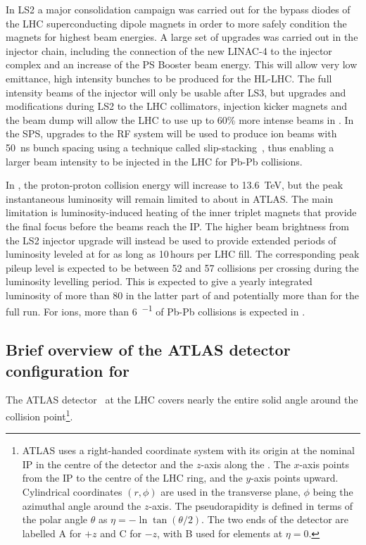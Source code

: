 \documentclass[cernpreprint, atlasdraft=false, UKenglish,british,orcidlogo, texmf, orcidlogo]{atlasdoc}
\begin{document}
In \gls{LS2} a major consolidation campaign was carried out for the
bypass diodes of the \gls{LHC} superconducting dipole magnets in order
to more safely condition the magnets for highest beam energies. A
large set of upgrades was carried out in the injector chain, including
the connection of the new \gls{LINAC-4} to the injector complex and an
increase of the \gls{PS} Booster beam energy. This will
allow very low emittance, high intensity bunches to be produced for
the \gls{HL-LHC}. The full intensity beams of the injector will only
be usable after \gls{LS3}, but upgrades and modifications during
\gls{LS2} to the \gls{LHC} collimators, injection kicker magnets and
the beam dump will allow the \gls{LHC} to use up to 60\% more intense
beams in \RunThr. In the \gls{SPS}, upgrades to the RF
system will be used to produce ion beams with \SI{50}{ns} bunch
spacing using a technique called slip-stacking~\cite{slipstacking}, thus enabling a
larger beam intensity to be injected in the \gls{LHC} for Pb-Pb collisions.
 
In \RunThr, the proton-proton collision energy will increase to
\SI{13.6}{TeV}, but the peak instantaneous luminosity will remain limited
to about \lumirunthree in ATLAS. The main
limitation is luminosity-induced heating of the inner triplet
magnets that provide the final focus before the beams reach the \gls{IP}. The higher beam brightness from the \gls{LS2} injector
upgrade will instead be used to provide extended periods of luminosity
leveled at \lumirunthree for as long as 10\,hours per \gls{LHC} fill. The corresponding peak pileup
level is expected to be between 52 and 57 collisions per crossing
during the luminosity levelling period. This is expected to give a
yearly integrated luminosity of more than \SI{80}{\ifb} in the latter
part of \RunThr and potentially more than \intlumirunthree for the full
run. For
ions, more than \SI{6}{\nb^{-1}} of Pb-Pb collisions is expected in \RunThr.


 
\subsection{Brief overview of the ATLAS detector configuration for \RunThr}
 
The ATLAS detector~\cite{PERF-2007-01} at the \gls{LHC} covers nearly the entire solid angle around the collision point\footnote{ATLAS uses a right-handed coordinate system with its origin at the nominal \gls{IP} in the centre of the detector and the $z$-axis along the \beampipe. The $x$-axis points from the \gls{IP} to the centre of the \gls{LHC} ring, and the $y$-axis points upward. Cylindrical coordinates $(r,\phi)$ are used in the transverse plane, $\phi$ being the azimuthal angle around the $z$-axis. The pseudorapidity is defined in terms of the polar angle $\theta$ as $\eta=-\ln\tan(\theta/2)$. The two ends of the detector are labelled A for $+z$ and C for $-z$, with B used for elements at $\eta=0$.}.
 
\end{document}
